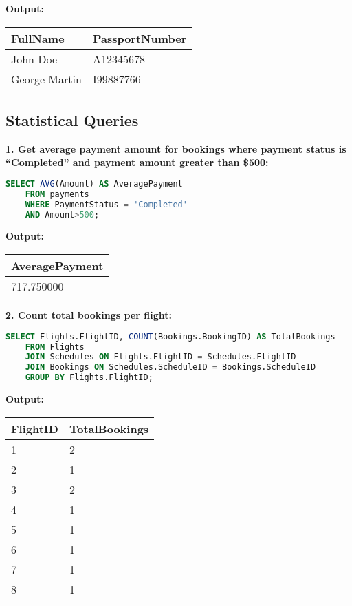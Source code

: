 \documentclass[14pt,a4paper]{extarticle}
\begin{document}
    \textbf{Output:}
    \begin{table}[h!]
\centering
\begin{tabular}{|l|l|}
    \hline
    \textbf{FullName} & \textbf{PassportNumber} \\ \hline
    John Doe          & A12345678 \\ \hline
    George Martin     & I99887766 \\ \hline
\end{tabular}
\end{table}

\subsection{Statistical Queries}
    \textbf{1. Get average payment amount for bookings where payment status is “Completed” and payment amount greater than \$500:}
    \begin{lstlisting}[language=SQL]
    SELECT AVG(Amount) AS AveragePayment
    FROM payments
    WHERE PaymentStatus = 'Completed'
    AND Amount>500;
    \end{lstlisting}
    
    \textbf{Output:}
    \begin{table}[h!]
\centering
\begin{tabular}{|l|}
\hline
\textbf{AveragePayment} \\ \hline
717.750000             \\ \hline
\end{tabular}
\end{table}

    \textbf{2. Count total bookings per flight:}
    \begin{lstlisting}[language=SQL]
    SELECT Flights.FlightID, COUNT(Bookings.BookingID) AS TotalBookings
    FROM Flights
    JOIN Schedules ON Flights.FlightID = Schedules.FlightID
    JOIN Bookings ON Schedules.ScheduleID = Bookings.ScheduleID
    GROUP BY Flights.FlightID;
    \end{lstlisting}
    
    \textbf{Output:}
    \begin{table}[h!]
\centering
\begin{tabular}{|l|l|}
    \hline
    \textbf{FlightID} & \textbf{TotalBookings} \\ \hline
    1  & 2 \\ \hline
    2  & 1 \\ \hline
    3  & 2 \\ \hline
    4  & 1 \\ \hline
    5  & 1 \\ \hline
    6  & 1 \\ \hline
    7  & 1 \\ \hline
    8  & 1 \\ \hline
\end{tabular}
\end{table}
\end{document}
